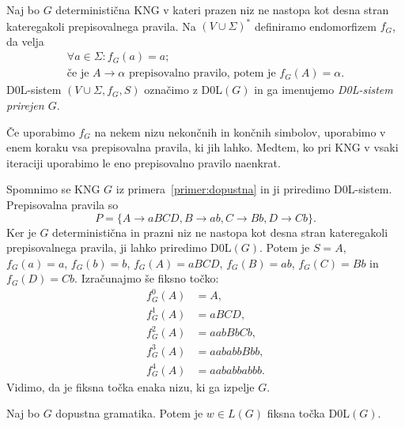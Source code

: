 \documentclass[fin1, tisk]{fmfdelo}
\theoremstyle{definition}
\begin{document}
\begin{definicija}
    Naj bo $G$ deterministična KNG v kateri prazen niz ne nastopa kot desna stran kateregakoli 
    prepisovalnega pravila. Na $(V \cup \Sigma)^*$ definiramo endomorfizem $f_G$, da velja
    \begin{gather*}
        \forall a \in \Sigma \colon f_G(a) = a; \\
        \text{če je } A \rightarrow \alpha \text{ prepisovalno pravilo, potem je } f_G(A) = \alpha.
    \end{gather*}
    D$0$L-sistem $(V \cup \Sigma, f_G, S)$ označimo z D$0$L$(G)$ in ga imenujemo 
    \emph{D0L-sistem prirejen $G$}.
\end{definicija}

Če uporabimo $f_G$ na nekem nizu nekončnih in končnih simbolov, uporabimo v enem koraku vsa 
prepisovalna pravila, ki jih lahko. Medtem, ko pri KNG v vsaki 
iteraciji uporabimo le eno prepisovalno pravilo naenkrat.

\begin{primer}\label{primer:fiksna}
    Spomnimo se KNG $G$ iz primera~\ref{primer:dopustna} in ji priredimo D$0$L-sistem. Prepisovalna
    pravila so
    \[
        P = \{ A \rightarrow \mathit{aBCD}, B \rightarrow \mathit{ab}, C \rightarrow 
        \mathit{Bb}, D \rightarrow \mathit{Cb} \}.
    \] 
    Ker je $G$ deterministična in prazni niz ne nastopa kot desna stran kateregakoli prepisovalnega
    pravila, ji lahko priredimo D$0$L$(G)$. Potem je $S = A$, $f_G(a) = a$, $f_G(b) = b$,
    $f_G(A) = aBCD$, $f_G(B) = ab$, $f_G(C) = Bb$ in $f_G(D) = Cb$. Izračunajmo še fiksno točko:
    \begin{align*}
        f_G^0(A) &= A, \\
        f_G^1(A) &= \mathit{aBCD}, \\
        f^2_G(A) &= \mathit{aabBbCb}, \\
        f^3_G(A) &= \mathit{aababbBbb}, \\
        f^4_G(A) &= \mathit{aababbabbb}.
    \end{align*}
    Vidimo, da je fiksna točka enaka nizu, ki ga izpelje $G$.
\end{primer}

\begin{trditev}\label{trditev:fiksna}
    Naj bo $G$ dopustna gramatika. Potem je $ w \in L(G)$ fiksna točka D0L$(G)$.
\end{trditev}
\end{document}
